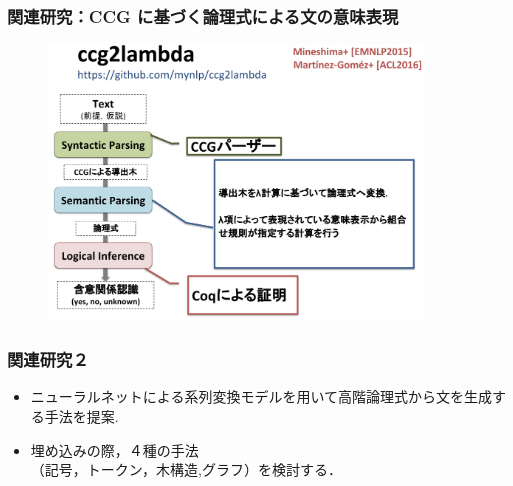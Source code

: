 \documentclass[dvipdfmx,cjk]{beamer}
\begin{document}
\begin{frame}
\frametitle{関連研究：CCG に基づく論理式による文の意味表現}
\begin{center}
\begin{figure}[h]
	\includegraphics[width=10cm]{c2l.png}
        \label{fig:c2l}
\end{figure}
\end{center}

\end{frame}




\begin{frame}
\frametitle{関連研究２}
\begin{center}
\end{center}
\begin{block}{}
  \begin{itemize}
    \item {\color{berry}ニューラルネットによる系列変換モデル}を用いて高階論理式から文を生成する手法を提案.\cite{seq2seq}
    \item 埋め込みの際，４種の手法\\（記号，トークン，木構造,グラフ）を検討する．
  \end{itemize}
\end{block}

\end{frame}
\end{document}

